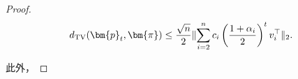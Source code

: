 \documentclass[lang=cn,newtx,10pt,scheme=chinese,chinesefont=nofont,citestyle=gb7714-2015, bibstyle=gb7714-2015]{elegantbook}
\begin{document}
\begin{refsection}
\begin{proof}
    \[
        d_{\textup{TV}}(\bm{p}_t,\bm{\pi})\le \frac{\sqrt{n}}{2}\lVert \sum_{i=2}^n{c_i\left(\frac{1+\alpha_i}{2}\right)^tv_i^{\top}}\rVert_2.
    \]

    此外，
    

\end{proof}
\end{refsection}
\end{document}
